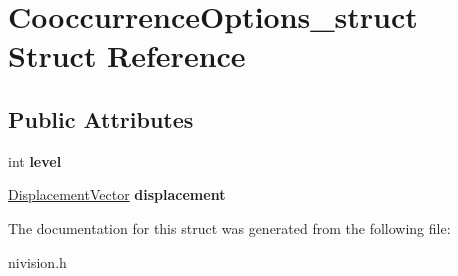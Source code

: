 \hypertarget{structCooccurrenceOptions__struct}{
\section{CooccurrenceOptions\_\-struct Struct Reference}
\label{structCooccurrenceOptions__struct}
}
\subsection*{Public Attributes}
\begin{DoxyCompactItemize}
\item 
\hypertarget{structCooccurrenceOptions__struct_a0369c702f21cb3c49e4ed3326f4136f8}{
int {\bfseries level}}
\label{structCooccurrenceOptions__struct_a0369c702f21cb3c49e4ed3326f4136f8}

\item 
\hypertarget{structCooccurrenceOptions__struct_a850d8a1f0a405b828e609f7c622d4497}{
\hyperlink{structDisplacementVector__struct}{DisplacementVector} {\bfseries displacement}}
\label{structCooccurrenceOptions__struct_a850d8a1f0a405b828e609f7c622d4497}

\end{DoxyCompactItemize}


The documentation for this struct was generated from the following file:\begin{DoxyCompactItemize}
\item 
nivision.h\end{DoxyCompactItemize}
